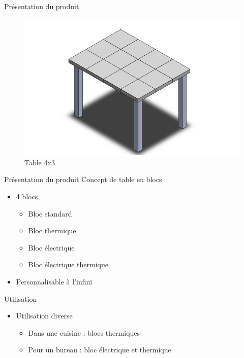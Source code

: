 \begin{frame}{Présentation du produit}
	\begin{figure}[H]
\centering
\includegraphics[scale=0.4]{./captures/table.png}
\caption{Table 4x3}
	\end{figure}	
\end{frame}

\begin{frame}{Présentation du produit}
Concept de table en blocs
\begin{itemize}
\item 4 blocs
\begin{itemize}
\item Bloc standard
\item Bloc thermique
\item Bloc électrique
\item Bloc électrique thermique
\end{itemize}
\item Personnalisable à l'infini
\end{itemize}
\end{frame}

\begin{frame}{Utilisation}
\begin{itemize}
\item Utilisation diverse
\begin{itemize}
\item Dans une cuisine : blocs thermiques
\item Pour un bureau : bloc électrique et thermique
\end{itemize}
\end{itemize}
\end{frame}

